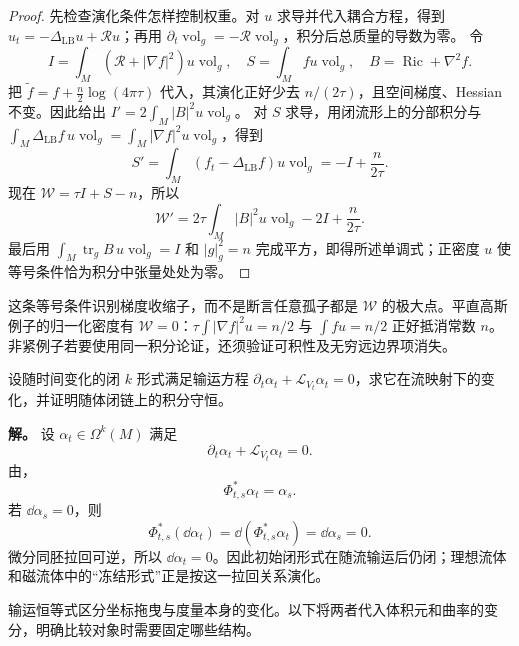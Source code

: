 \begin{proof}
先检查演化条件怎样控制权重。对 $u$ 求导并代入耦合方程，得到 $u_t=-\Delta_{\mathrm{LB}}u+\mathcal R u$；再用 $\partial_t\operatorname{vol}_g=-\mathcal R\operatorname{vol}_g$，积分后总质量的导数为零。
令
\[
 I=\int_M(\mathcal R+|\nabla f|^2)u\operatorname{vol}_g,
 \quad S=\int_Mfu\operatorname{vol}_g,
 \quad B=\operatorname{Ric}+\nabla^2f.
\]
把 $\widetilde f=f+\frac n2\log(4\pi\tau)$ 代入，其演化正好少去 $n/(2\tau)$，且空间梯度、Hessian 不变。因此给出 $I'=2\int_M|B|^2u\operatorname{vol}_g$。
对 $S$ 求导，用闭流形上的分部积分与 $\int_M\Delta_{\mathrm{LB}}f\,u\operatorname{vol}_g=\int_M|\nabla f|^2u\operatorname{vol}_g$，得到
\[
 S'=\int_M(f_t-\Delta_{\mathrm{LB}}f)u\operatorname{vol}_g
 =-I+\frac n{2\tau}.
\]
现在 $\mathcal W=\tau I+S-n$，所以
\[
 \mathcal W'=2\tau\int_M|B|^2u\operatorname{vol}_g-2I+\frac n{2\tau}.
\]
最后用 $\int_M\operatorname{tr}_g B\,u\operatorname{vol}_g=I$ 和 $|g|_g^2=n$ 完成平方，即得所述单调式；正密度 $u$ 使等号条件恰为积分中张量处处为零。
\end{proof}

这条等号条件识别梯度收缩子，而不是断言任意孤子都是 $\mathcal W$ 的极大点。平直高斯例子的归一化密度有 $\mathcal W=0$：$\tau\int|\nabla f|^2u=n/2$ 与 $\int fu=n/2$ 正好抵消常数 $n$。非紧例子若要使用同一积分论证，还须验证可积性及无穷远边界项消失。

\begin{exbox}[闭形式的冻结输运]
设随时间变化的闭 $k$ 形式满足输运方程 $\partial_t\alpha_t+\mathcal L_{V_t}\alpha_t=0$，求它在流映射下的变化，并证明随体闭链上的积分守恒。

\textbf{解。} 设 $\alpha_t\in\Omega^k(M)$ 满足
\[
\partial_t\alpha_t+\mathcal L_{V_t}\alpha_t=0.
\]
由，
\[
\Phi_{t,s}^*\alpha_t=\alpha_s.
\]
若 $\dd\alpha_s=0$，则
\[
\Phi_{t,s}^*(\dd\alpha_t)
=\dd(\Phi_{t,s}^*\alpha_t)
=\dd\alpha_s=0.
\]
微分同胚拉回可逆，所以 $\dd\alpha_t=0$。因此初始闭形式在随流输运后仍闭；理想流体和磁流体中的“冻结形式”正是按这一拉回关系演化。
\end{exbox}
输运恒等式区分坐标拖曳与度量本身的变化。以下将两者代入体积元和曲率的变分，明确比较对象时需要固定哪些结构。




